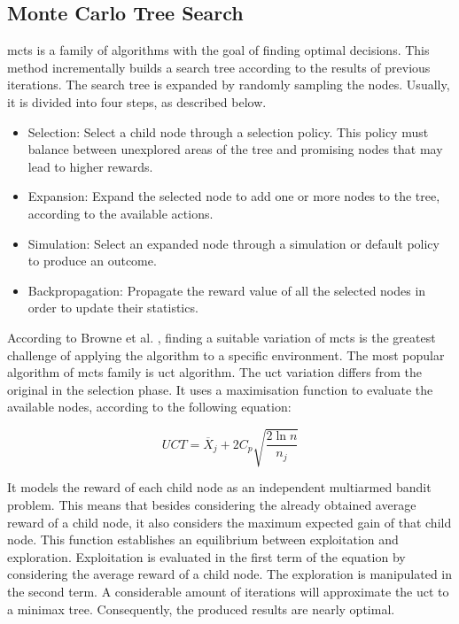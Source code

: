 \subsection{Monte Carlo Tree Search}


\gls{mcts} is a family of algorithms with the goal of finding optimal decisions.
This method incrementally builds a search tree according to the results of previous iterations.
The search tree is expanded by randomly sampling the nodes.
Usually, it is divided into four steps, as described below.
\begin{itemize}
  \item Selection: Select a child node through a selection policy. This policy must balance between unexplored areas of the tree and promising nodes that may lead to higher rewards.
  \item Expansion: Expand the selected node to add one or more nodes to the tree, according to the available actions.
  \item Simulation: Select an expanded node through a simulation or default policy to produce an outcome.
  \item Backpropagation: Propagate the reward value of all the selected nodes in order to update their statistics.
\end{itemize}

According to Browne et al. \cite{Browne2012}, finding a suitable variation of \gls{mcts} is the greatest challenge of applying the algorithm to a specific environment.
The most popular algorithm of \gls{mcts} family is \gls{uct} algorithm.
The \gls{uct} variation differs from the original in the selection phase.
It uses a maximisation function to evaluate the available nodes, according to the following equation:

\begin{equation}
    UCT = \overline{X}_j + 2C_p\sqrt{\frac{2\ln n}{n_j}}
\end{equation}


It models the reward of each child node as an independent multiarmed bandit problem.
This means that besides considering the already obtained average reward of a child node, it also considers the maximum expected gain of that child node.
This function establishes an equilibrium between exploitation and exploration.
Exploitation is evaluated in the first term of the equation by considering the average reward of a child node.
The exploration is manipulated in the second term.
A considerable amount of iterations will approximate the \gls{uct} to a minimax tree.
Consequently, the produced results are nearly optimal.

 